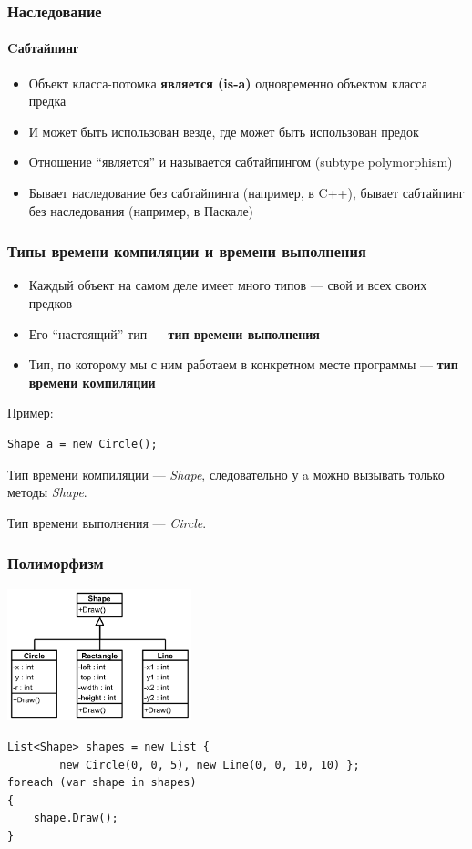\documentclass[xetex,mathserif,serif]{beamer}
\begin{document}
	\begin{frame}
		\frametitle{Наследование}
		\framesubtitle{Cабтайпинг}
		\begin{itemize}
			\item Объект класса-потомка \textbf{является (is-a)} одновременно объектом класса предка
			\item И может быть использован везде, где может быть использован предок
			\item Отношение ``является'' и называется сабтайпингом (subtype polymorphism)
			\item Бывает наследование без сабтайпинга (например, в C++), бывает сабтайпинг  без наследования (например, в Паскале)
		\end{itemize}
	\end{frame}

	\begin{frame}[fragile]
		\frametitle{Типы времени компиляции и времени выполнения}
		\begin{itemize}
			\item Каждый объект на самом деле имеет много типов --- свой и всех своих предков
			\item Его ``настоящий'' тип --- \textbf{тип времени выполнения}
			\item Тип, по которому мы с ним работаем в конкретном месте программы --- \textbf{тип времени компиляции}
		\end{itemize}

		Пример:
		\begin{verbatim}
Shape a = new Circle();
		\end{verbatim}
		Тип времени компиляции --- \textit{Shape}, следовательно у a можно вызывать только методы \textit{Shape}. 
		
		Тип времени выполнения --- \textit{Circle}.
	\end{frame}

	\begin{frame}[fragile]
		\frametitle{Полиморфизм}
		\begin{center}
			\includegraphics[width=0.4\textwidth]{polymorphism.png}
		\end{center}

		\begin{verbatim}
List<Shape> shapes = new List { 
        new Circle(0, 0, 5), new Line(0, 0, 10, 10) };
foreach (var shape in shapes) 
{
    shape.Draw();
}
		\end{verbatim}
	\end{frame}
\end{document}
